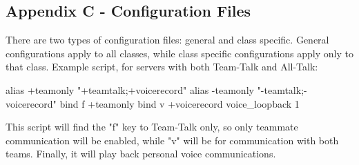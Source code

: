 \subsection{Appendix C - Configuration Files}
There are two types of configuration files: general and class specific. General configurations apply to all classes, while class specific configurations apply only to that class. 
Example script, for servers with both Team-Talk and All-Talk:

alias +teamonly "+teamtalk;+voicerecord"
alias -teamonly "-teamtalk;-voicerecord"
bind f +teamonly
bind v +voicerecord
voice\_loopback 1

This script will find the "f" key to Team-Talk only, so only teammate communication will be enabled, while "v" will be for communication with both teams.  Finally, it will play back personal voice communications.